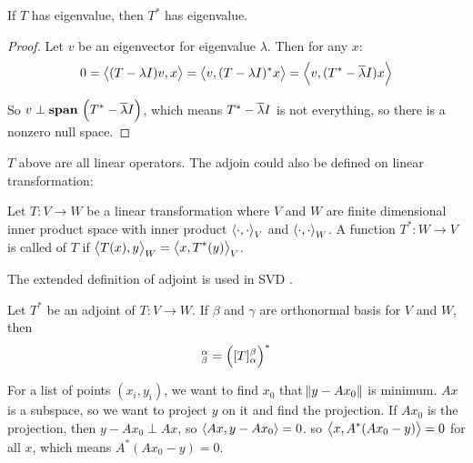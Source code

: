 \begin{theorem}\label{congjugate_transpose_has_eigenvalue}
    If $T$ has eigenvalue, then $T^*$ has eigenvalue.    
\end{theorem}
\begin{proof}
    Let $v$ be an eigenvector for eigenvalue $\lambda$. Then for any $x$:
    \begin{equation*}
        0 = \innerproduct{(T-\lambda I)v}{x} = \innerproduct{v}{(T-\lambda I)^* x} = \innerproduct{v}{(T^* - \conjugate{\lambda}I) x}
    \end{equation*}
    
    So $v \perp \spanset{T^* - \conjugate{\lambda}I}$, which means $T^* - \overline{\lambda}I$ is not everything, so there is a nonzero null space.
\end{proof}


$T$ above are all linear operators. The adjoin could also be defined on linear transformation:

\begin{definition}
    Let $T : V \rightarrow W$ be a linear transformation where $V$ and $W$ are finite dimensional inner product space with inner product $\innerproduct{\cdot{}}{\cdot{}}_V$ and $\innerproduct{\cdot{}}{\cdot{}}_W$. A function $T^* : W \rightarrow V$ is called  of $T$ if $\innerproduct{T(x)}{y}_W = \innerproduct{x}{T^*(y)}_V$.
\end{definition}

The extended definition of adjoint is used in SVD .

\begin{theorem}
    Let $T^*$ be an adjoint of $T: V \rightarrow W$. If $\beta$ and $\gamma$ are orthonormal basis for $V$ and $W$, then
    \begin{equation}
        [T^*]_\beta^\alpha = \mleft( [T]_\alpha^\beta \mright)^*
    \end{equation}
\end{theorem}



\begin{example}
    For a list of points $(x_i, y_i)$, we want to find $x_0$ that $\norm{y - Ax_0}$ is minimum. $Ax$ is a subspace, so we want to project $y$ on it and find the projection. If $Ax_0$ is the projection, then $y - Ax_0 \perp Ax$, so $\innerproduct{Ax}{y - Ax_0} = 0$. so $\innerproduct{x}{A^* (Ax_0 - y)} = 0$ for all $x$, which means $A^* (Ax_0 - y) = 0$.
\end{example}

